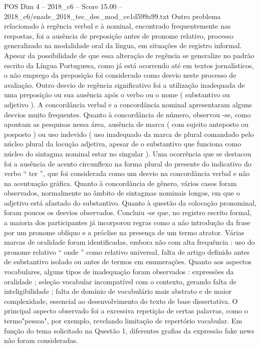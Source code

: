 \begin{textsample}{POS Dim 4 – 2018\_c6 – Score 15.00 – 2018\_c6/enade\_2018\_tec\_des\_mod\_ce1d599a99.txt}
Outro problema relacionado à regência verbal e à nominal, encontrado frequentemente nas respostas, foi a ausência de preposição antes de pronome relativo, processo generalizado na modalidade oral da língua, em situações de registro informal.
Apesar da possibilidade de que essa alteração de regência se generalize no padrão escrito da Língua Portuguesa, como já está ocorrendo até em textos jornalísticos, o não emprego da preposição foi considerado como desvio neste processo de avaliação.
Outro desvio de regência significativo foi a utilização inadequada de uma preposição ou sua ausência após o verbo ou o nome ( substantivo ou adjetivo ).
A concordância verbal e a concordância nominal apresentaram alguns desvios muito frequentes.
Quanto à concordância de número, observou -se, como apontam as pesquisas nessa área, ausência de marca ( com sujeito anteposto ou posposto ) ou uso indevido ( uso inadequado da marca de plural comandado pelo núcleo plural da locução adjetiva, apesar de o substantivo que funciona como núcleo do sintagma nominal estar no singular ).
Uma ocorrência que se destacou foi a ausência de acento circunflexo na forma plural do presente do indicativo do verbo “ ter ”, que foi considerada como um desvio na concordância verbal e não na acentuação gráfica.
Quanto à concordância de gênero, vários casos foram observados, normalmente no âmbito de sintagmas nominais longos, em que o adjetivo está afastado do substantivo.
Quanto à questão da colocação pronominal, foram poucos os desvios observados.
Concluiu -se que, no registro escrito formal, a maioria dos participantes já incorporou regras como a não introdução da frase por um pronome oblíquo e a próclise na presença de um termo atrator.
Várias marcas de oralidade foram identificadas, embora não com alta frequência : uso do pronome relativo “ onde ” como relativo universal, falta de artigo definido antes de substantivo isolado ou antes de termos em enumerações.
Quanto aos aspectos vocabulares, alguns tipos de inadequação foram observados : expressões da oralidade ; seleção vocabular incompatível com o contexto, gerando falta de inteligibilidade ; falta de domínio de vocabulário mais abstrato e de maior complexidade, essencial ao desenvolvimento do texto de base dissertativa.
O principal aspecto observado foi a excessiva repetição de certas palavras, como o termo"pessoa", por exemplo, revelando limitação de repertório vocabular.
Em função do tema solicitado na Questão 1, diferentes grafias da expressão fake news não foram consideradas.

\end{textsample}
